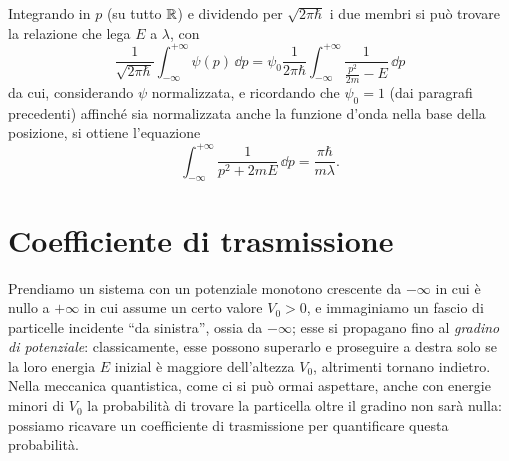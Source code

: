 Integrando in $p$ (su tutto $\mathbb{R}$) e dividendo per $\sqrt{2\pi\hbar}$ i due membri si può trovare la relazione che lega $E$ a $\lambda$, con
\begin{equation}
	\frac1{\sqrt{2\pi\hbar}}\int_{-\infty}^{+\infty}\psi(p)\,\dd p=\psi_0\frac1{2\pi\hbar}\int_{-\infty}^{+\infty}\frac1{\frac{p^2}{2m}-E}\,\dd p
\end{equation}
da cui, considerando $\psi$ normalizzata, e ricordando che $\psi_0=1$ (dai paragrafi precedenti) affinch\'e sia normalizzata anche la funzione d'onda nella base della posizione, si ottiene l'equazione
\begin{equation}
	\int_{-\infty}^{+\infty}\frac1{p^2+2mE}\,\dd p=\frac{\pi\hbar}{m\lambda}.
\end{equation}

\section{Coefficiente di trasmissione}
Prendiamo un sistema con un potenziale monotono crescente da $-\infty$ in cui è nullo a $+\infty$ in cui assume un certo valore $V_0>0$, e immaginiamo un fascio di particelle incidente ``da sinistra'', ossia da $-\infty$; esse si propagano fino al \emph{gradino di potenziale}: classicamente, esse possono superarlo e proseguire a destra solo se la loro energia $E$ inizial è maggiore dell'altezza $V_0$, altrimenti tornano indietro.
Nella meccanica quantistica, come ci si può ormai aspettare, anche con energie minori di $V_0$ la probabilità di trovare la particella oltre il gradino non sarà nulla: possiamo ricavare un coefficiente di trasmissione per quantificare questa probabilità.

